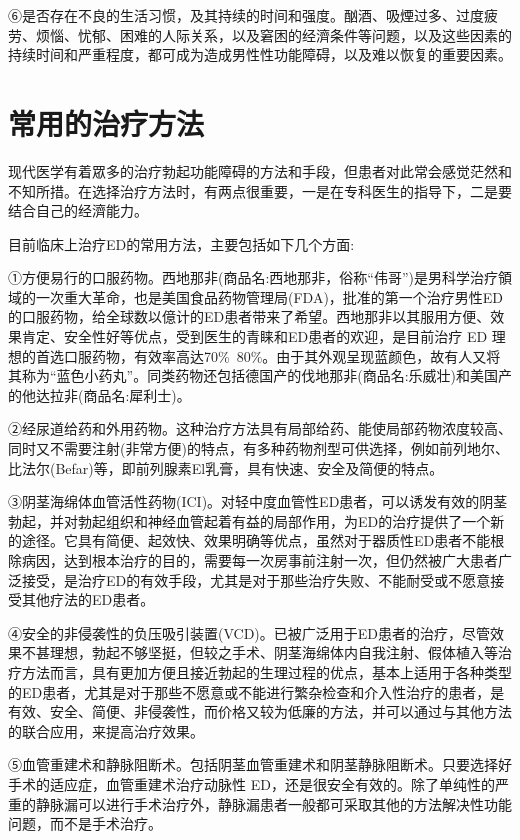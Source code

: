 \documentclass[12pt,UTF8]{ctexbook}
\begin{document}
⑥是否存在不良的生活习惯，及其持续的时间和强度。酗酒、吸煙过多、过度疲劳、烦惱、忧郁、困难的人际关系，以及窘困的经濟条件等问题，以及这些因素的持续时间和严重程度，都可成为造成男性性功能障碍，以及难以恢复的重要因素。

\section{常用的治疗方法}

现代医学有着眾多的治疗勃起功能障碍的方法和手段，但患者对此常会感觉茫然和不知所措。在选择治疗方法时，有两点很重要，一是在专科医生的指导下，二是要结合自己的经濟能力。

目前临床上治疗ED的常用方法，主要包括如下几个方面:

①方便易行的口服药物。西地那非(商品名:西地那非，俗称“伟哥”)是男科学治疗領域的一次重大革命，也是美国食品药物管理局(FDA)，批准的第一个治疗男性ED的口服药物，给全球数以億计的ED患者带来了希望。西地那非以其服用方便、效果肯定、安全性好等优点，受到医生的青睐和ED患者的欢迎，是目前治疗 ED 理想的首选口服药物，有效率高达70\%~80\%。由于其外观呈现蓝颜色，故有人又将其称为“蓝色小药丸”。同类药物还包括德国产的伐地那非(商品名:乐威壮)和美国产的他达拉非(商品名:犀利士)。

②经尿道给药和外用药物。这种治疗方法具有局部给药、能使局部药物浓度较高、同时又不需要注射(非常方便)的特点，有多种药物剂型可供选择，例如前列地尔、比法尔(Befar)等，即前列腺素El乳膏，具有快速、安全及简便的特点。

③阴茎海绵体血管活性药物(ICI)。对轻中度血管性ED患者，可以诱发有效的阴茎勃起，并对勃起组织和神经血管起着有益的局部作用，为ED的治疗提供了一个新的途径。它具有简便、起效快、效果明确等优点，虽然对于器质性ED患者不能根除病因，达到根本治疗的目的，需要每一次房事前注射一次，但仍然被广大患者广泛接受，是治疗ED的有效手段，尤其是对于那些治疗失败、不能耐受或不愿意接受其他疗法的ED患者。

④安全的非侵袭性的负压吸引装置(VCD)。已被广泛用于ED患者的治疗，尽管效果不甚理想，勃起不够坚挺，但较之手术、阴茎海绵体内自我注射、假体植入等治疗方法而言，具有更加方便且接近勃起的生理过程的优点，基本上适用于各种类型的ED患者，尤其是对于那些不愿意或不能进行繁杂检查和介入性治疗的患者，是有效、安全、简便、非侵袭性，而价格又较为低廉的方法，并可以通过与其他方法的联合应用，来提高治疗效果。

⑤血管重建术和静脉阻断术。包括阴茎血管重建术和阴茎静脉阻断术。只要选择好手术的适应症，血管重建术治疗动脉性 ED，还是很安全有效的。除了单纯性的严重的静脉漏可以进行手术治疗外，静脉漏患者一般都可采取其他的方法解决性功能问题，而不是手术治疗。
\end{document}
